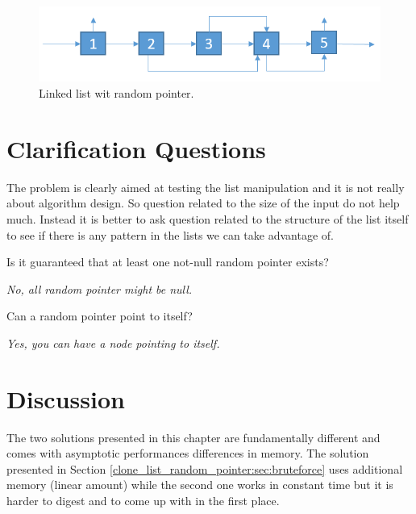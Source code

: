 \begin{figure}
	\label{fig:clone_list_random_pointer:list1}
	\centering
	\includegraphics[scale=0.6]{sources/clone_list_random_pointer/images/random_list_1}
	\caption{Linked list wit random pointer.}
\end{figure}


\section{Clarification Questions}
The problem is clearly aimed at testing the list manipulation and it is not really about algorithm design. So question related to the size of the input do not help much. Instead it is better to ask question related to the structure of the list itself to see if there is any pattern in the lists we can take advantage of.
\begin{QandA}
	\item \begin{questionitem} \begin{question} Is it guaranteed that at least one not-null random pointer exists?  \end{question} 	 
    \begin{answered}
		\textit{No, all random pointer might be null.}
	\end{answered} \end{questionitem}
	\item \begin{questionitem} \begin{question} Can a random pointer point to itself?  \end{question} 	 
    \begin{answered}
		\textit{Yes, you can have a node pointing to itself.}
	\end{answered} \end{questionitem}
	
\end{QandA}

\section{Discussion}
\label{clone_list_random_pointer:sec:discussion}
The two solutions presented in this chapter are fundamentally different and comes with asymptotic performances differences in memory.
The solution presented in Section \ref{clone_list_random_pointer:sec:bruteforce} uses additional memory (linear amount) while the second one works in constant time but it is harder to digest and to come up with in the first place.

